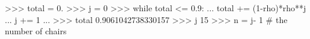 
>>> total = 0.
>>> j = 0
>>> while total <= 0.9:
...    total += (1-rho)*rho**j
...    j += 1
...
>>> total
0.9061042738330157
>>> j
15
>>> n = j- 1 # the number of chairs

